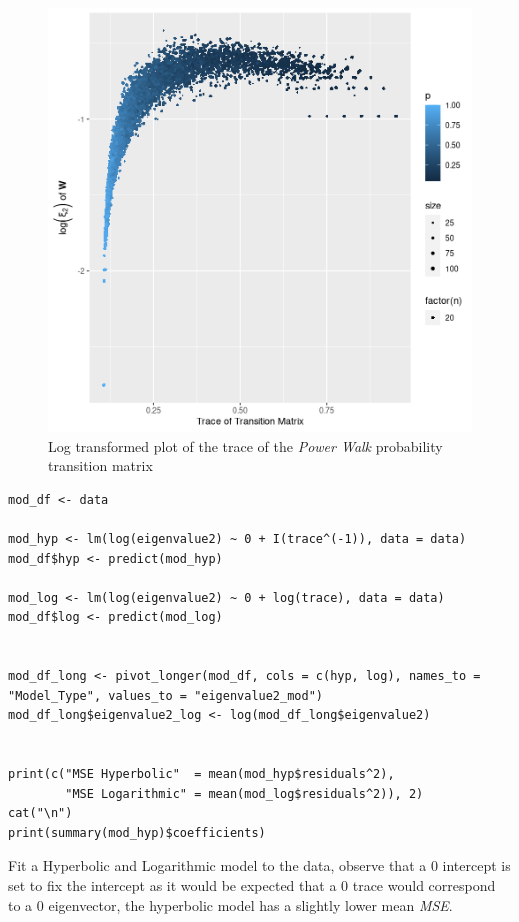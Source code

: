 \documentclass[11pt]{article}
\begin{document}
\begin{figure}[htbp]
\centering
\includegraphics[width=12cm]{media/trace_plot_log_er.png}
\caption{\label{fig:trace_plot_log_er}Log transformed plot of the trace of the \emph{Power Walk} probability transition matrix}
\end{figure}

\begin{listing}[htbp]
\begin{verbatim}
mod_df <- data

mod_hyp <- lm(log(eigenvalue2) ~ 0 + I(trace^(-1)), data = data)
mod_df$hyp <- predict(mod_hyp)

mod_log <- lm(log(eigenvalue2) ~ 0 + log(trace), data = data)
mod_df$log <- predict(mod_log)


mod_df_long <- pivot_longer(mod_df, cols = c(hyp, log), names_to = "Model_Type", values_to = "eigenvalue2_mod")
mod_df_long$eigenvalue2_log <- log(mod_df_long$eigenvalue2)


print(c("MSE Hyperbolic"  = mean(mod_hyp$residuals^2),
        "MSE Logarithmic" = mean(mod_log$residuals^2)), 2)
cat("\n")
print(summary(mod_hyp)$coefficients)

\end{verbatim}
\caption{\label{mod_trace}Fit a Hyperbolic and Logarithmic model to the data, observe that a 0 intercept is set to fix the intercept as it would be expected that a 0 trace would correspond to a 0 eigenvector, the hyperbolic model has a slightly lower mean \emph{MSE}.}
\end{listing}
\end{document}
